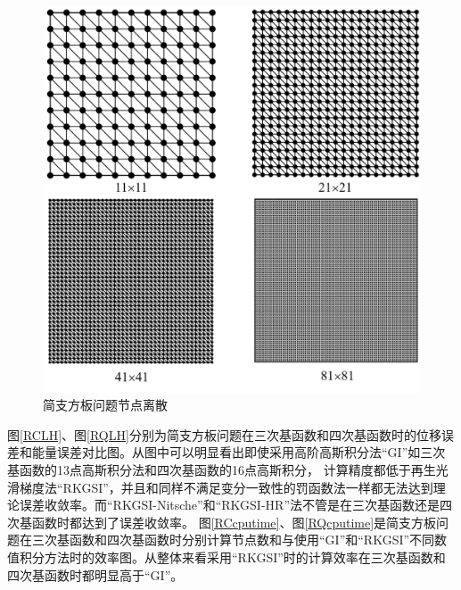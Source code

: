 \begin{figure}[H]
\centering
      \includegraphics[scale=0.5]{figure/PHR/R/rectangularmsh.png}
    \caption{简支方板问题节点离散}\label{rectangularmsh}
\end{figure}
\newpage
 图\ref{RCLH}、图\ref{RQLH}分别为简支方板问题在三次基函数和四次基函数时的位移误差和能量误差对比图。从图中可以明显看出即使采用高阶高斯积分法“GI”如三次基函数的13点高斯积分法和四次基函数的16点高斯积分，
计算精度都低于再生光滑梯度法“RKGSI”，并且和同样不满足变分一致性的罚函数法一样都无法达到理论误差收敛率。而“RKGSI-Nitsche”和“RKGSI-HR”法不管是在三次基函数还是四次基函数时都达到了误差收敛率。
图\ref{RCcputime}、图\ref{RQcputime}是简支方板问题在三次基函数和四次基函数时分别计算节点数和与使用“GI”和“RKGSI”不同数值积分方法时的效率图。从整体来看采用“RKGSI”时的计算效率在三次基函数和四次基函数时都明显高于“GI”。  

